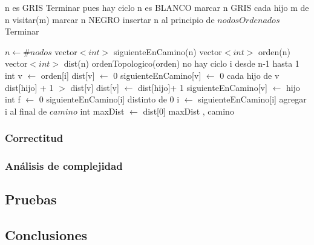\begin{algorithm}[H]
\caption{} 
\begin{codebox}
\li \If n es GRIS \Do
\li 	 Terminar pues hay ciclo
\li \End
\li \If n es BLANCO \Do
\li 	marcar n GRIS
\li		\For cada hijo m de n \Do
\li			visitar(m)			
\li		\End
\li		marcar n NEGRO
\li 		insertar n al principio de $nodosOrdenados$
\li 		Terminar
\li \End

\End
\end{codebox}
\end{algorithm}
 


\begin{algorithm}[H]
\caption{} 
\begin{codebox}
\li $n \gets \# nodos $
\li vector$<int>$ siguienteEnCamino(n)
\li vector$<int>$ orden(n)
\li vector$<int>$ dist(n)
\li ordenTopologico(orden)
\li \If no hay ciclo \Do
\li 	\For i desde n-1 hasta 1 \Do
\li		int v $\gets$ orden[i]
\li		dist[v] $\gets$ 0
\li 		siguienteEnCamino[v] $\gets$ 0
\li		\For cada hijo de v \Do
\li		  	\If dist[hijo] + 1 $>$ dist[v] \Do
\li				dist[v] $\gets$ dist[hijo]+ 1
\li				siguienteEnCamino[v] $\gets$ hijo
\li			\End
\li		\End
\li	\End
\li	int f $\gets$ 0
\li	\While siguienteEnCamino[i] distinto de 0 \Do
\li		i $\gets$ siguienteEnCamino[i]
\li		agregar i al final de $camino$
\li	\End
\li 	int maxDist $\gets$ dist[0]
\li 	\Return maxDist , camino	
\li \End
\li \Else \Do
\li {}
\End

\end{codebox}
\end{algorithm}

\subsubsection{Correctitud} 



\subsubsection{An\'alisis de complejidad}
 
 

\subsection{Pruebas}



\subsection{Conclusiones}
